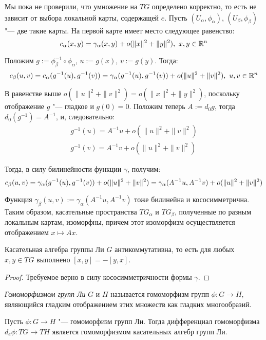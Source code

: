 \begin{note}
	Мы пока не проверили, что умножение на $T{G}$ определено корректно, то есть не зависит от выбора локальной карты, содержащей $e$. Пусть $(U_\alpha, \phi_\alpha)$, $(U_\beta, \phi_\beta)$ "--- две такие карты. \pagebreak На первой карте имеет место следующее равенство:
	\[c_\alpha(x, y) = \gamma_\alpha(x, y) + o(\|x\|^2 + \|y\|^2),~x, y \in \mathbb{R}^n\]
	
	Положим $g := \phi_\beta^{-1} \circ \phi_\alpha$, $u := g(x)$, $v := g(y)$. Тогда:
	\[c_\beta(u, v) = c_\alpha(g^{-1}(u), g^{-1}(v)) = \gamma_\alpha(g^{-1}(u), g^{-1}(v)) + o(\|u\|^2 + \|v\|^2),~u, v \in \mathbb{R}^n\]
	
	В равенстве выше $o(\|u\|^2 + \|v\|^2) = o(\|x\|^2 + \|y\|^2)$, поскольку отображение $g$ "--- гладкое и $g(0) = 0$. Положим теперь $A := d_0g$, тогда $d_0(g^{-1}) = A^{-1}$, и, следовательно:
	\begin{gather*}
		g^{-1}(u) = A^{-1}u + o(\|u\|^2 + \|v\|^2) \\
		g^{-1}(v) = A^{-1}v + o(\|u\|^2 + \|v\|^2)
	\end{gather*}
	
	Тогда, в силу билинейности функции $\gamma$, получим:
	\[c_\beta(u, v) = \gamma_\alpha(g^{-1}(u), g^{-1}(v)) + o(\|u\|^2 + \|v\|^2) = \gamma_\alpha(A^{-1}u, A^{-1}v) + o(\|u\|^2 + \|v\|^2)\]
	
	Функция $\gamma_\beta(u, v) := \gamma_\alpha(A^{-1}u, A^{-1}v)$ тоже билинейна и кососимметрична. Таким образом, касательные пространства $TG_\alpha$ и $TG_\beta$, полученные по разным локальным картам, изоморфны, причем этот изоморфизм осуществляется отображением $x \mapsto Ax$.
\end{note}

\begin{proposition}
	Касательная алгебра группы Ли $G$ антикоммутативна, то есть для любых $x, y \in TG$ выполнено $[x, y] = -[y, x]$.
\end{proposition}

\begin{proof}
	Требуемое верно в силу кососимметричности формы $\gamma$.
\end{proof}

\begin{definition}
	\textit{Гомоморфизмом групп Ли} $G$ и $H$ называется гомоморфизм групп $\phi: G \to H$, являющийся гладким отображением этих множеств как гладких многообразий.
\end{definition}

\begin{theorem}
	Пусть $\phi : G \to H$ "--- гомоморфизм групп Ли. Тогда дифференциал гомоморфизма $d_e\phi: TG \to TH$ является гомоморфизмом касательных алгебр групп Ли.
\end{theorem}

